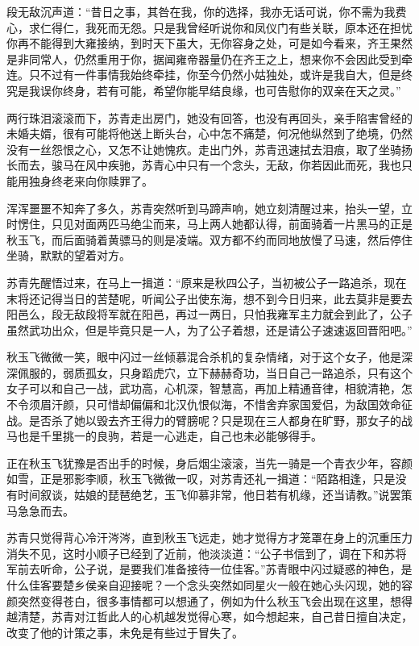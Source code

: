 段无敌沉声道：“昔日之事，其咎在我，你的选择，我亦无话可说，你不需为我费心，求仁得仁，我死而无怨。只是我曾经听说你和凤仪门有些关联，原本还在担忧你再不能得到大雍接纳，到时天下虽大，无你容身之处，可是如今看来，齐王果然是非同常人，仍然重用于你，据闻雍帝器量仍在齐王之上，想来你不会因此受到牵连。只不过有一件事情我始终牵挂，你至今仍然小姑独处，或许是我自大，但是终究是我误你终身，若有可能，希望你能早结良缘，也可告慰你的双亲在天之灵。”

两行珠泪滚滚而下，苏青走出房门，她没有回答，也没有再回头，亲手陷害曾经的未婚夫婿，很有可能将他送上断头台，心中怎不痛楚，何况他纵然到了绝境，仍然没有一丝怨恨之心，又怎不让她愧疚。走出门外，苏青迅速拭去泪痕，取了坐骑扬长而去，骏马在风中疾驰，苏青心中只有一个念头，无敌，你若因此而死，我也只能用独身终老来向你赎罪了。

浑浑噩噩不知奔了多久，苏青突然听到马蹄声响，她立刻清醒过来，抬头一望，立时愣住，只见对面两匹马绝尘而来，马上两人她都认得，前面骑着一片黑马的正是秋玉飞，而后面骑着黄骠马的则是凌端。双方都不约而同地放慢了马速，然后停住坐骑，默默的望着对方。

苏青先醒悟过来，在马上一揖道：“原来是秋四公子，当初被公子一路追杀，现在末将还记得当日的苦楚呢，听闻公子出使东海，想不到今日归来，此去莫非是要去阳邑么，段无敌段将军就在阳邑，再过一两日，只怕我雍军主力就会到此了，公子虽然武功出众，但是毕竟只是一人，为了公子着想，还是请公子速速返回晋阳吧。”

秋玉飞微微一笑，眼中闪过一丝倾慕混合杀机的复杂情绪，对于这个女子，他是深深佩服的，弱质孤女，只身蹈虎穴，立下赫赫奇功，当日自己一路追杀，只有这个女子可以和自己一战，武功高，心机深，智慧高，再加上精通音律，相貌清艳，怎不令须眉汗颜，只可惜却偏偏和北汉仇恨似海，不惜舍弃家国爱侣，为敌国效命征战。是否杀了她以毁去齐王得力的臂膀呢？只是现在三人都身在旷野，那女子的战马也是千里挑一的良驹，若是一心逃走，自己也未必能够得手。

正在秋玉飞犹豫是否出手的时候，身后烟尘滚滚，当先一骑是一个青衣少年，容颜如雪，正是邪影李顺，秋玉飞微微一叹，对苏青还礼一揖道：“陌路相逢，只是没有时间叙谈，姑娘的琵琶绝艺，玉飞仰慕非常，他日若有机缘，还当请教。”说罢策马急急而去。

苏青只觉得背心冷汗涔涔，直到秋玉飞远走，她才觉得方才笼罩在身上的沉重压力消失不见，这时小顺子已经到了近前，他淡淡道：“公子书信到了，调在下和苏将军前去听命，公子说，是要我们准备接待一位佳客。”苏青眼中闪过疑惑的神色，是什么佳客要楚乡侯亲自迎接呢？一个念头突然如同星火一般在她心头闪现，她的容颜突然变得苍白，很多事情都可以想通了，例如为什么秋玉飞会出现在这里，想得越清楚，苏青对江哲此人的心机越发觉得心寒，如今想起来，自己昔日擅自决定，改变了他的计策之事，未免是有些过于冒失了。

